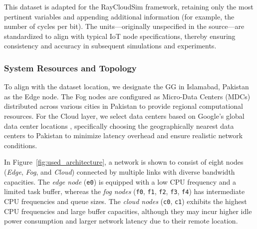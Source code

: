 \documentclass[preprint,3p,authoryear]{elsarticle}
\begin{document}
\begin{table}[h!]
\centering

\caption{Statistical Summary of Generated Tasks}\label{tab:task-statistics}
\end{table}


This dataset is adapted for the RayCloudSim framework, retaining only the most pertinent variables and appending additional information (for example, the number of cycles per bit). The units—originally unspecified in the source—are standardized to align with typical IoT node specifications, thereby ensuring consistency and accuracy in subsequent simulations and experiments.

\subsubsection{System Resources and Topology}\label{subsec:system_resources_topology}

To align with the dataset location, we designate the GG in Islamabad, Pakistan as the Edge node. The Fog nodes are configured as Micro-Data Centers (MDCs) distributed across various cities in Pakistan to provide regional computational resources. For the Cloud layer, we select data centers based on Google's global data center locations \citep{googleDataCenters}, specifically choosing the geographically nearest data centers to Pakistan to minimize latency overhead and ensure realistic network conditions.


In Figure~\ref{fig:used_architecture}, a network is shown to consist of eight nodes (\textit{Edge}, \textit{Fog}, and \textit{Cloud}) connected by multiple links with diverse bandwidth capacities. The \textit{edge node} (\texttt{e0}) is equipped with a low CPU frequency and a limited task buffer, whereas the \textit{fog nodes} (\texttt{f0}, \texttt{f1}, \texttt{f2}, \texttt{f3}, \texttt{f4}) has intermediate CPU frequencies and queue sizes. The \textit{cloud nodes} (\texttt{c0}, \texttt{c1}) exhibits the highest CPU frequencies and large buffer capacities, although they may incur higher idle power consumption and larger network latency due to their remote location.
\end{document}
